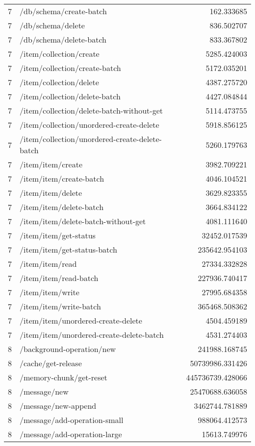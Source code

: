 \begin{longtable}{rlr}
7 & /db/schema/create-batch & 162.333685 \\
7 & /db/schema/delete & 836.502707 \\
7 & /db/schema/delete-batch & 833.367802 \\
7 & /item/collection/create & 5285.424003 \\
7 & /item/collection/create-batch & 5172.035201 \\
7 & /item/collection/delete & 4387.275720 \\
7 & /item/collection/delete-batch & 4427.084844 \\
7 & /item/collection/delete-batch-without-get & 5114.473755 \\
7 & /item/collection/unordered-create-delete & 5918.856125 \\
7 & /item/collection/unordered-create-delete-batch & 5260.179763 \\
7 & /item/item/create & 3982.709221 \\
7 & /item/item/create-batch & 4046.104521 \\
7 & /item/item/delete & 3629.823355 \\
7 & /item/item/delete-batch & 3664.834122 \\
7 & /item/item/delete-batch-without-get & 4081.111640 \\
7 & /item/item/get-status & 32452.017539 \\
7 & /item/item/get-status-batch & 235642.954103 \\
7 & /item/item/read & 27334.332828 \\
7 & /item/item/read-batch & 227936.740417 \\
7 & /item/item/write & 27995.684358 \\
7 & /item/item/write-batch & 365468.508362 \\
7 & /item/item/unordered-create-delete & 4504.459189 \\
7 & /item/item/unordered-create-delete-batch & 4531.274403 \\
8 & /background-operation/new & 241988.168745 \\
8 & /cache/get-release & 50739986.331426 \\
8 & /memory-chunk/get-reset & 445736739.428066 \\
8 & /message/new & 25470688.636058 \\
8 & /message/new-append & 3462744.781889 \\
8 & /message/add-operation-small & 988064.412573 \\
8 & /message/add-operation-large & 15613.749976 \\

\end{longtable}
